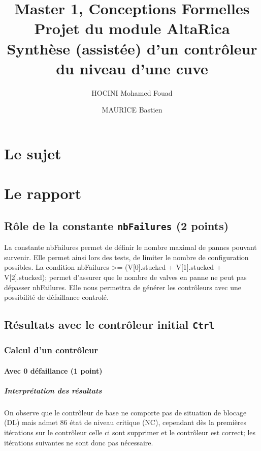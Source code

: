 \documentclass[a4paper]{book}
\newcommand{\altarica}{{\sc AltaRica}}
\begin{document}
\title{Master 1, Conceptions Formelles\\
Projet du module \altarica\\
Synthèse (assistée) d'un contrôleur du niveau d'une cuve}

\date{}

\author{HOCINI Mohamed Fouad \and MAURICE Bastien}

\maketitle

\chapter{Le sujet}


\chapter{Le rapport}
\section{Rôle de la constante {\tt nbFailures} (2 points)}
La constante nbFailures permet de définir le nombre maximal de pannes pouvant survenir. Elle permet ainsi lors des tests, de limiter le nombre de configuration possibles. La condition nbFailures >= (V[0].stucked + V[1].stucked + V[2].stucked); permet d'assurer que le nombre de valves en panne ne peut pas dépasser nbFailures. Elle nous permettra de générer les contrôleurs avec une possibilité de défaillance controlé.\

\section{Résultats avec le contrôleur initial {\tt Ctrl}}
\subsection{Calcul d'un contrôleur}
\subsubsection{Avec 0 défaillance (1 point)}


%
%
%
\paragraph{Interprétation des résultats}
On observe que le contrôleur de base ne comporte pas de situation de blocage (DL) mais admet 86 état de niveau critique (NC), cependant dès la premières itérations sur le contrôleur celle ci sont supprimer et le contrôleur est correct; les itérations suivantes ne sont donc pas nécessaire.\
\end{document}

